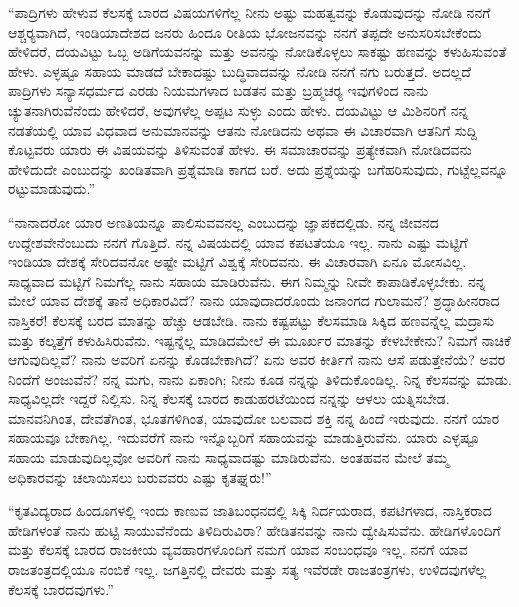  “ಪಾದ್ರಿಗಳು ಹೇಳುವ ಕೆಲಸಕ್ಕೆ ಬಾರದ ವಿಷಯಗಳಿಗೆಲ್ಲ ನೀನು ಅಷ್ಟು ಮಹತ್ವವನ್ನು ಕೊಡುವುದನ್ನು ನೋಡಿ ನನಗೆ ಆಶ್ಚರ‍್ಯವಾಗಿದೆ, ಇಂಡಿಯಾದೇಶದ ಜನರು ಹಿಂದೂ ರೀತಿಯ ಭೋಜನವನ್ನು ನನಗೆ ತಪ್ಪದೇ ಅನುಸರಿಸಬೇಕೆಂದು ಹೇಳಿದರೆ, ದಯವಿಟ್ಟು ಒಬ್ಬ ಅಡಿಗೆಯವನನ್ನು ಮತ್ತು ಅವನನ್ನು ನೋಡಿಕೊಳ್ಳಲು ಸಾಕಷ್ಟು ಹಣವನ್ನು ಕಳುಹಿಸುವಂತೆ ಹೇಳು. ಎಳ್ಳಷ್ಟೂ ಸಹಾಯ ಮಾಡದೆ ಬೇಕಾದಷ್ಟು ಬುದ್ಧಿವಾದವನ್ನು ನೋಡಿ ನನಗೆ ನಗು ಬರುತ್ತದೆ. ಅದಲ್ಲದೆ ಪಾದ್ರಿಗಳು ಸನ್ಯಾಸಧರ್ಮದ ಎರಡು ನಿಯಮಗಳಾದ ಬಡತನ ಮತ್ತು ಬ್ರಹ್ಮಚರ‍್ಯ ಇವುಗಳಿಂದ ನಾನು ಚ್ಯುತನಾಗಿರುವೆನೆಂದು ಹೇಳಿದರೆ, ಅವುಗಳೆಲ್ಲ ಅಪ್ಪಟ ಸುಳ್ಳು ಎಂದು ಹೇಳು. ದಯವಿಟ್ಟು ಆ ಮಿಶಿನರಿಗೆ ನನ್ನ ನಡತೆಯಲ್ಲಿ ಯಾವ ವಿಧವಾದ ಅನುಮಾನವನ್ನು ಆತನು ನೋಡಿದನು ಅಥವಾ ಈ ವಿಚಾರವಾಗಿ ಆತನಿಗೆ ಸುದ್ದಿ ಕೊಟ್ಟವರು ಯಾರು ಈ ವಿಷಯವನ್ನು ತಿಳಿಸುವಂತೆ ಹೇಳು. ಈ ಸಮಾಚಾರವನ್ನು ಪ್ರತ್ಯೇಕವಾಗಿ ನೋಡಿದವನು ಹೇಳಿದುದೇ ಎಂಬುದನ್ನು ಖಂಡಿತವಾಗಿ ಪ್ರಶ್ನೆಮಾಡಿ ಕಾಗದ ಬರೆ. ಅದು ಪ್ರಶ್ನೆಯನ್ನು ಬಗೆಹರಿಸುವುದು, ಗುಟ್ಟೆಲ್ಲವನ್ನೂ ರಟ್ಟುಮಾಡುವುದು.” 

 “ನಾನಾದರೋ‌ ಯಾರ ಅಣತಿಯನ್ನೂ ಪಾಲಿಸುವವನಲ್ಲ ಎಂಬುದನ್ನು ಜ್ಞಾಪಕದಲ್ಲಿಡು. ನನ್ನ ಜೀವನದ ಉದ್ದೇಶವೇನೆಂಬುದು ನನಗೆ ಗೊತ್ತಿದೆ. ನನ್ನ ವಿಷಯದಲ್ಲಿ ಯಾವ ಕಪಟತೆಯೂ ಇಲ್ಲ. ನಾನು ಎಷ್ಟು ಮಟ್ಟಿಗೆ ಇಂಡಿಯಾ ದೇಶಕ್ಕೆ ಸೇರಿದವನೋ ಅಷ್ಟೇ ಮಟ್ಟಿಗೆ ವಿಶ್ವಕ್ಕೆ ಸೇರಿದವನು. ಈ ವಿಚಾರವಾಗಿ ಏನೂ ಮೋಸವಿಲ್ಲ. ಸಾಧ್ಯವಾದ ಮಟ್ಟಿಗೆ ನಿಮಗೆಲ್ಲ ನಾನು ಸಹಾಯ ಮಾಡಿರುವೆನು. ಈಗ ನಿಮ್ಮನ್ನು ನೀವೇ ಕಾಪಾಡಿಕೊಳ್ಳಬೇಕು. ನನ್ನ ಮೇಲೆ ಯಾವ ದೇಶಕ್ಕೆ ತಾನೆ ಅಧಿಕಾರವಿದೆ? ನಾನು ಯಾವುದಾದರೊಂದು ಜನಾಂಗದ ಗುಲಾಮನೆ? ಶ್ರದ್ಧಾಹೀನರಾದ ನಾಸ್ತಿಕರೆ! ಕೆಲಸಕ್ಕೆ ಬರದ ಮಾತನ್ನು ಹೆಚ್ಚು ಆಡಬೇಡಿ. ನಾನು ಕಷ್ಟಪಟ್ಟು ಕೆಲಸಮಾಡಿ ಸಿಕ್ಕಿದ ಹಣವನ್ನೆಲ್ಲ ಮದ್ರಾಸು ಮತ್ತು ಕಲ್ಕತ್ತೆಗೆ ಕಳುಹಿಸಿರುವೆನು. ಇಷ್ಟನ್ನೆಲ್ಲ ಮಾಡಿದಮೇಲೆ ಈ ಮೂರ್ಖರ ಮಾತನ್ನು ಕೇಳಬೇಕೇನು? ನಿಮಗೆ ನಾಚಿಕೆ ಆಗುವುದಿಲ್ಲವೆ? ನಾನು ಅವರಿಗೆ ಏನನ್ನು ಕೊಡಬೇಕಾಗಿದೆ? ಏನು ಅವರ ಕೀರ್ತಿಗೆ ನಾನು ಆಸೆ ಪಡುತ್ತೇನೆಯೆ? ಅವರ ನಿಂದೆಗೆ ಅಂಜುವೆನೆ? ನನ್ನ ಮಗು, ನಾನು ಏಕಾಂಗಿ; ನೀನು ಕೂಡ ನನ್ನನ್ನು ತಿಳಿದುಕೊಂಡಿಲ್ಲ. ನಿನ್ನ ಕೆಲಸವನ್ನು ಮಾಡು. ಸಾಧ್ಯವಿಲ್ಲದೇ ಇದ್ದರೆ ನಿಲ್ಲಿಸು. ನಿನ್ನ ಕೆಲಸಕ್ಕೆ ಬಾರದ ಕಾಡುಹರಟೆಯಿಂದ ನನ್ನನ್ನು ಆಳಲು ಯತ್ನಿಸಬೇಡ. ಮಾನವನಿಗಿಂತ, ದೇವತೆಗಿಂತ, ಭೂತಗಳಿಗಿಂತ, ಯಾವುದೋ ಬಲವಾದ ಶಕ್ತಿ ನನ್ನ ಹಿಂದೆ ಇರುವುದು. ನನಗೆ ಯಾರ ಸಹಾಯವೂ ಬೇಕಾಗಿಲ್ಲ. ಇದುವರೆಗೆ ನಾನು ಇನ್ನೊಬ್ಬರಿಗೆ ಸಹಾಯವನ್ನು ಮಾಡುತ್ತಿರುವೆನು. ಯಾರು ಎಳ್ಳಷ್ಟೂ ಸಹಾಯ ಮಾಡುವುದಿಲ್ಲವೋ ಅವರಿಗೆ ನಾನು ಸಾಧ್ಯವಾದಷ್ಟು ಮಾಡಿರುವೆನು. ಅಂತಹವನ ಮೇಲೆ ತಮ್ಮ ಅಧಿಕಾರವನ್ನು ಚಲಾಯಿಸಲು ಬರುವವರು ಎಷ್ಟು ಕೃತಘ್ನರು!” 

 “ಕೃತವಿದ್ಯರಾದ ಹಿಂದೂಗಳಲ್ಲಿ ಇಂದು ಕಾಣುವ ಜಾತಿಬಂಧನದಲ್ಲಿ ಸಿಕ್ಕಿ ನಿರ್ದಯರಾದ, ಕಪಟಿಗಳಾದ, ನಾಸ್ತಿಕರಾದ ಹೇಡಿಗಳಂತೆ ನಾನು ಹುಟ್ಟಿ ಸಾಯುವೆನೆಂದು ತಿಳಿದಿರುವಿರಾ? ಹೇಡಿತನವನ್ನು ನಾನು ದ್ವೇಷಿಸುವೆನು. ಹೇಡಿಗಳೊಂದಿಗೆ ಮತ್ತು ಕೆಲಸಕ್ಕೆ ಬಾರದ ರಾಜಕೀಯ ವ್ಯವಹಾರಗಳೊಂದಿಗೆ ನಮಗೆ ಯಾವ ಸಂಬಂಧವೂ ಇಲ್ಲ. ನನಗೆ ಯಾವ ರಾಜತಂತ್ರದಲ್ಲಿಯೂ ನಂಬಿಕೆ ಇಲ್ಲ. ಜಗತ್ತಿನಲ್ಲಿ ದೇವರು ಮತ್ತು ಸತ್ಯ ಇವೆರಡೇ ರಾಜತಂತ್ರಗಳು, ಉಳಿದವುಗಳೆಲ್ಲ ಕೆಲಸಕ್ಕೆ ಬಾರದವುಗಳು.” 

